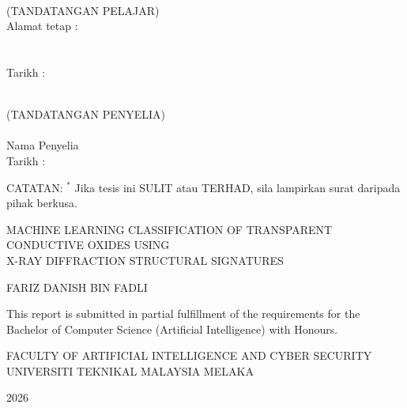 \documentclass[12pt, oneside]{article} %
\begin{document}
\vspace{5mm}
\noindent
\begin{minipage}[t]{0.5\textwidth}
\centering
\underline{\hspace{6cm}} \\
(TANDATANGAN PELAJAR) \\[4mm]
Alamat tetap : \underline{} \\
\underline{} \\
\underline{} \\[4mm]
Tarikh : \underline{}
\end{minipage}%
\begin{minipage}[t]{0.5\textwidth}
\centering
\underline{\hspace{6cm}} \\
(TANDATANGAN PENYELIA) \\[4mm]
\underline{} \\
Nama Penyelia \\[8mm]
Tarikh : \underline{\hspace{4.5cm}}
\end{minipage}

\vspace{3mm}
\noindent
CATATAN: \; $^{\ast}$ Jika tesis ini SULIT atau TERHAD, sila lampirkan surat daripada pihak berkusa.

\restoregeometry
{}
\setlength{\parskip}{1.3em}


\setcounter{page}{1}
\justifying




\begin{center}

\vfill \null
\vspace{1cm}
{MACHINE LEARNING CLASSIFICATION OF TRANSPARENT CONDUCTIVE OXIDES USING \\
X-RAY DIFFRACTION STRUCTURAL SIGNATURES}

\vskip 1.6in
{FARIZ DANISH BIN FADLI}

\vskip 1.6in
This report is submitted in partial fulfillment of the requirements for the \\
Bachelor of Computer Science (Artificial Intelligence) with Honours.


\vskip 1.6in
FACULTY OF ARTIFICIAL INTELLIGENCE AND CYBER SECURITY \\
UNIVERSITI TEKNIKAL MALAYSIA MELAKA

\vspace{2mm}
2026


\end{center}
\end{document}
